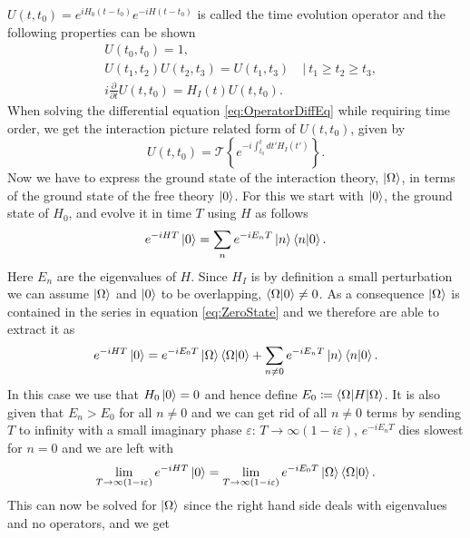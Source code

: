 $U(t,t_0) = e^{iH_0(t-t_0)}e^{-iH(t-t_0)}$ is called the time evolution operator \cite{DysonSeries1, DysonSeries2} and the following properties can be shown
\begin{align}
 & U(t_0,t_0) =  1, \\
 & U(t_1,t_2)U(t_2,t_3) = U(t_1,t_3)\quad |\ t_1 \geq t_2 \geq t_3, \\
 & i\frac{\partial}{\partial t} U(t,t_0) = H_I(t)U(t,t_0). \label{eq:OperatorDiffEq}
\end{align}
When solving the differential equation \ref{eq:OperatorDiffEq} while requiring time order, we get the interaction picture related form of $U(t,t_0)$, given by
\begin{equation}\label{eq:UOpperator}
 U(t,t_0) = \mathcal{T} \left\{ e^{-i\int_{t_0}^t dt' H_I(t')} \right\}.
\end{equation}
Now we have to express the ground state of the interaction theory, $\ket{\Omega}$, in terms of the ground state of the free theory $\ket{0}$. For this we start with $\ket{0}$, the ground state of $H_0$, and evolve it in time $T$ using $H$ as follows
\begin{equation}\label{eq:ZeroState}
 e^{-iHT} \ket{0} = \sum_{n} e^{-iE_nT}\ket{n} \braket{n | 0}.
\end{equation}
Here $E_n$ are the eigenvalues of $H$. Since $H_I$ is by definition a small perturbation we can assume $\ket{\Omega}$ and $\ket{0}$ to be overlapping, \ie $\braket{\Omega | 0} \neq 0$. As a consequence $\ket{\Omega}$ is contained in the series in equation \ref{eq:ZeroState} and we therefore are able to extract it as
\begin{equation}
 e^{-iHT} \ket{0} = e^{-iE_0T} \ket{\Omega} \braket{\Omega | 0} + \sum_{n \neq 0} e^{-iE_nT}\ket{n} \braket{n | 0}.
\end{equation}
In this case we use that $H_0 \ket{0} = 0$ and hence define $E_0 \coloneqq \braket{\Omega | H | \Omega}$. It is also given that $E_n > E_0$ for all $n \neq 0$ and we can get rid of all $n \neq 0$ terms by sending $T$ to infinity with a small imaginary phase $\varepsilon$: $T \rightarrow \infty(1 - i\varepsilon)$, \ie $e^{-iE_nT}$ dies slowest for $n = 0$ and we are left with
\begin{equation}
 \lim_{T\to \infty(1-i\varepsilon)}e^{-iHT} \ket{0} = \lim_{T\to \infty(1-i\varepsilon)} e^{-iE_0T} \ket{\Omega} \braket{\Omega | 0}.
\end{equation}
This can now be solved for $\ket{\Omega}$ since the right hand side deals with eigenvalues and no operators, and we get
